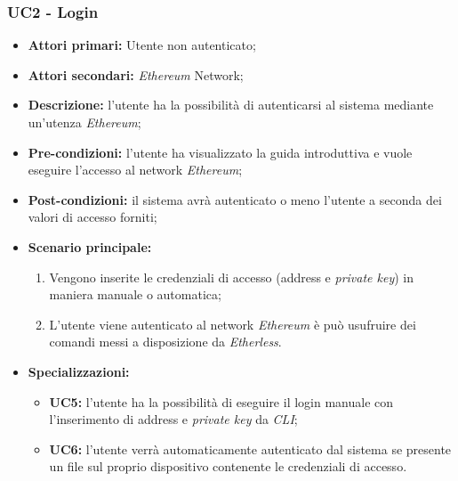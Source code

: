 \subsubsection{UC2 - Login}
\begin{itemize}
	\item \textbf{Attori primari:} Utente non autenticato;
	\item \textbf{Attori secondari:} \textit{Ethereum\glo} Network;
	\item \textbf{Descrizione:} l'utente ha la possibilità di autenticarsi al sistema mediante un'utenza \textit{Ethereum\glos}; 
	\item \textbf{Pre-condizioni:} l'utente ha visualizzato la guida introduttiva e vuole eseguire l'accesso al network \textit{Ethereum};
	\item \textbf{Post-condizioni:} il sistema avrà autenticato o meno l'utente a seconda dei valori di accesso forniti;
	\item \textbf{Scenario principale:} 
	\begin{enumerate}
		\item Vengono inserite le credenziali di accesso (address e \textit{private key\glos}) in maniera manuale o automatica;
		\item L'utente viene autenticato al network \textit{Ethereum\glo} è può usufruire dei comandi messi a disposizione da \textit{Etherless}.
	\end{enumerate}
	\item \textbf{Specializzazioni:}
	\begin{itemize}
		\item \textbf{UC5:} l'utente ha la possibilità di eseguire il login manuale con l'inserimento di address e \textit{private key\glo} da \textit{CLI\glos};
		\item \textbf{UC6:} l'utente verrà automaticamente autenticato dal sistema se presente un file sul proprio dispositivo contenente le credenziali di accesso.  
	\end{itemize}
\end{itemize}
